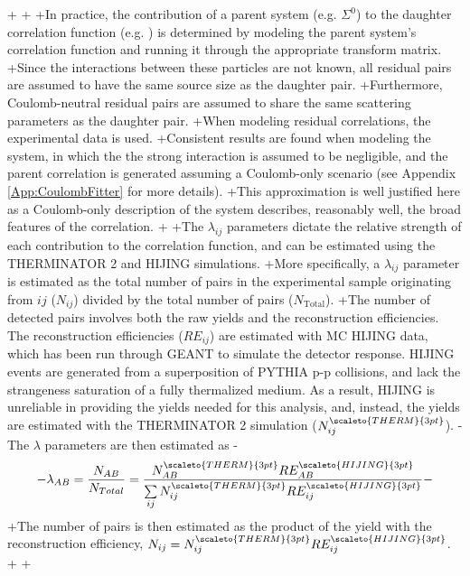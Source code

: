 \begin{table}[htbp]
\begin{table}[htbp]
+
+
+In practice, the contribution of a parent system (e.g. $\Sigma^{0}$\KchP) to the daughter correlation function (e.g. \LamKchP) is determined by modeling the parent system's correlation function and running it through the appropriate transform matrix.
+Since the interactions between these particles are not known, all residual pairs are assumed to have the same source size as the daughter pair.
+Furthermore, Coulomb-neutral residual pairs are assumed to share the same scattering parameters as the daughter pair.
+When modeling \XiKpm residual correlations, the experimental \XiKpm data is used. 
+Consistent results are found when modeling the \XiKpm system, in which the the strong interaction is assumed to be negligible, and the parent correlation is generated assuming a Coulomb-only scenario (see Appendix \ref{App:CoulombFitter} for more details).
+This approximation is well justified here as a Coulomb-only description of the system describes, reasonably well, the broad features of the correlation.   
+
+The $\lambda_{ij}$ parameters dictate the relative strength of each contribution to the correlation function, and can be estimated using the THERMINATOR 2 and HIJING simulations.
+More specifically, a $\lambda_{ij}$ parameter is estimated as the total number of \LamK pairs in the experimental sample originating from $ij$ ($N_{ij}$) divided by the total number of \LamK pairs ($N_{\mathrm{Total}}$).
+The number of detected \LamK pairs involves both the raw yields and the reconstruction efficiencies.
 The reconstruction efficiencies ($RE_{ij}$) are estimated with MC HIJING data, which has been run through GEANT to simulate the detector response.
 HIJING events are generated from a superposition of PYTHIA p-p collisions, and lack the strangeness saturation of a fully thermalized medium.
 As a result, HIJING is unreliable in providing the yields needed for this analysis, and, instead, the yields are estimated with the THERMINATOR 2 simulation ($N_{ij}^{\scaleto{THERM}{3pt}}$).
-The $\lambda$ parameters are then estimated as
-\begin{equation}
-\lambda_{AB} = \frac{N_{AB}}{N_{Total}} = \frac{N_{AB}^{\scaleto{THERM}{3pt}}RE_{AB}^{\scaleto{HIJING}{3pt}}}{\sum\limits_{ij} N_{ij}^{\scaleto{THERM}{3pt}}RE_{ij}^{\scaleto{HIJING}{3pt}}}
-\end{equation}
+The number of \LamK pairs is then estimated as the product of the yield with the reconstruction efficiency, $N_{ij} = N_{ij}^{\scaleto{THERM}{3pt}}RE_{ij}^{\scaleto{HIJING}{3pt}}$.
+
+
 

\end{table}
\end{table}
